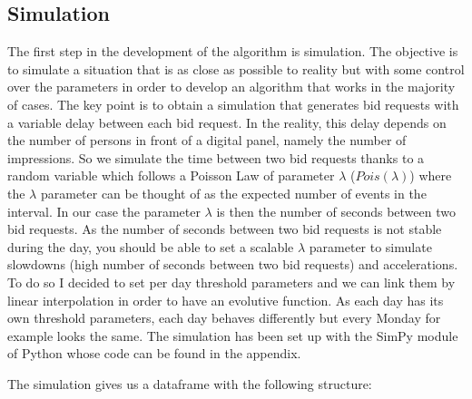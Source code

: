 \documentclass[12pt]{article}
\begin{document}
\subsection{Simulation}
The first step in the development of the algorithm is simulation. The objective is to simulate a situation that is as close as possible to reality but with some control over the parameters in order to develop an algorithm that works in the majority of cases. The key point is to obtain a simulation that generates bid requests with a variable delay between each bid request. In the reality, this delay depends on the number of persons in front of a digital panel, namely the number of impressions. So we simulate the time between two bid requests thanks to a random variable which follows a Poisson Law of parameter $\lambda$ ($Pois(\lambda)$) where the $\lambda$ parameter can be thought of as the expected number of events in the interval. In our case the parameter $\lambda$ is then the number of seconds between two bid requests. As the number of seconds between two bid requests is not stable during the day, you should be able to set a scalable $\lambda$ parameter to simulate slowdowns (high number of seconds between two bid requests) and accelerations. To do so I decided to set per day threshold parameters and we can link them by linear interpolation in order to have an evolutive function. As each day has its own threshold parameters, each day behaves differently but every Monday for example looks the same. The simulation has been set up with the SimPy module of Python whose code can be found in the appendix.

The simulation gives us a dataframe with the following structure:\\
\end{document}
